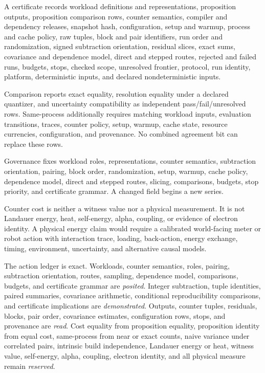 A certificate records workload definitions and representations, proposition outputs, proposition comparison rows,
counter semantics, compiler and dependency releases, snapshot hash, configuration, setup and warmup, process and
cache policy, raw tuples, block and pair identifiers, run order and randomization, signed subtraction orientation,
residual slices, exact sums, covariance and dependence model, direct and stepped routes, rejected and failed runs,
budgets, stops, checked scope, unresolved frontier, protocol, run identity, platform, deterministic inputs, and
declared nondeterministic inputs.

Comparison reports exact equality, resolution equality under a declared quantizer, and uncertainty compatibility as
independent pass/fail/unresolved rows.  Same-process additionally requires matching workload inputs, evaluation
transitions, traces, counter policy, setup, warmup, cache state, resource currencies, configuration, and provenance.
No combined agreement bit can replace these rows.

Governance fixes workload roles, representations, counter semantics, subtraction orientation, pairing, block order,
randomization, setup, warmup, cache policy, dependence model, direct and stepped routes, slicing, comparisons, budgets,
stop priority, and certificate grammar.  A changed field begins a new series.

Counter cost is neither a witness value nor a physical measurement.  It is not Landauer energy, heat, self-energy,
alpha, coupling, or evidence of electron identity.  A physical energy claim would require a calibrated world-facing
meter or robot action with interaction trace, loading, back-action, energy exchange, timing, environment, uncertainty,
and alternative causal models.

The action ledger is exact.  Workloads, counter semantics, roles, pairing, subtraction orientation, routes, sampling,
dependence model, comparisons, budgets, and certificate grammar are \emph{posited}.  Integer subtraction, tuple
identities, paired summaries, covariance arithmetic, conditional reproducibility comparisons, and certificate
implications are \emph{demonstrated}.  Outputs, counter tuples, residuals, blocks, pair order, covariance estimates,
configuration rows, stops, and provenance are \emph{read}.  Cost equality from proposition equality, proposition
identity from equal cost, same-process from near or exact counts, naive variance under correlated pairs, intrinsic
build independence, Landauer energy or heat, witness value, self-energy, alpha, coupling, electron identity, and all
physical measure remain \emph{reserved}.
